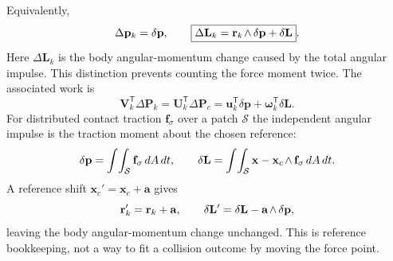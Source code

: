\documentclass[11pt,a4paper]{article}
\newcommand{\rw}[1]{\mathord{#1\mkern2mu\wedge}}
\begin{document}
Equivalently,
\begin{equation}
\Delta \mathbf{p}_k=\delta \mathbf{p},\qquad
\boxed{\Delta \mathbf{L}_k=\rw{\mathbf{r}_k}\,\delta \mathbf{p}+\delta \mathbf{L}}.
\end{equation}
Here $\Delta \mathbf{L}_k$ is the body angular-momentum change caused by the total angular impulse. This distinction prevents counting the force moment twice. The associated work is
\begin{equation}
\mathbf{V}_k^{\mathsf T}\Delta \mathbf{P}_k
=\mathbf{U}_k^{\mathsf T}\Delta\mathbf{P}_c
=\mathbf{u}_k^{\mathsf T}\delta \mathbf{p}
+\boldsymbol{\omega}_k^{\mathsf T}\delta \mathbf{L}.
\end{equation}
For distributed contact traction $\mathbf{f}_{\sigma}$ over a patch $\mathcal S$ the independent angular impulse is the traction moment about the chosen reference:
\begin{equation}
\delta \mathbf{p}=\int\!\int_{\mathcal S}\mathbf{f}_{\sigma}\,dA\,dt,\qquad
\delta \mathbf{L}=\int\!\int_{\mathcal S}\rw{\mathbf{x}-\mathbf{x}_c}\,\mathbf{f}_{\sigma}\,dA\,dt.
\end{equation}
A reference shift $\mathbf{x}_c'=\mathbf{x}_c+\mathbf{a}$ gives
\begin{equation}
\mathbf{r}_k'=\mathbf{r}_k+\mathbf{a},\qquad
\delta \mathbf{L}'=\delta \mathbf{L}-\rw{\mathbf{a}}\,\delta \mathbf{p},
\end{equation}
leaving the body angular-momentum change unchanged. This is reference bookkeeping, not a way to fit a collision outcome by moving the force point.
\end{document}
